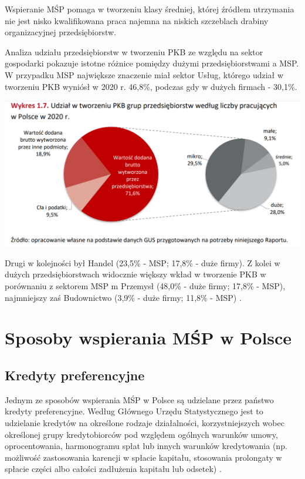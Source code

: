 \documentclass[11pt]{article}
\begin{document}
Wspieranie MŚP pomaga w tworzeniu klasy średniej, której źródłem utrzymania nie jest nisko kwalifikowana praca najemna 
na niskich szczeblach drabiny organizacyjnej przedsiębiorstw.
\medskip

Analiza udziału przedsiębiorstw w tworzeniu PKB ze względu na sektor gospodarki pokazuje istotne różnice
pomiędzy dużymi przedsiębiorstwami a MSP. W przypadku MSP największe znaczenie miał sektor Usług, którego udział w tworzeniu PKB wyniósł
w 2020 r. 46,8\%, podczas gdy w dużych firmach - 30,1\%.

\begin{center}
\includegraphics[scale=0.6]{img/udzialMSP.png}
\end{center}

Drugi w kolejności był Handel (23,5\% - MSP; 17,8\% - duże
firmy). Z kolei w dużych przedsiębiorstwach widocznie większy wkład w tworzenie PKB
w porównaniu z sektorem MSP m Przemysł (48,0\% - duże firmy; 17,8\% - MSP),
najmniejszy zaś Budownictwo (3,9\% - duże firmy; 11,8\% - MSP) \cite{RaportPARPoMSP}. 

\section*{Sposoby wspierania MŚP w Polsce}

\subsection*{Kredyty preferencyjne}

Jednym ze sposobów wspierania MŚP w Polsce są udzielane przez państwo kredyty preferencyjne.
Według Głównego Urzędu Statystycznego jest to udzielanie kredytów na określone rodzaje działalności, 
korzystniejszych wobec określonej grupy kredytobiorców pod względem ogólnych warunków umowy, oprocentowania, 
harmonogramu spłat lub innych warunków kredytowania (np. możliwość zastosowania karencji w spłacie kapitału, 
stosowania prolongaty w spłacie części albo całości zadłużenia kapitału lub odsetek) \cite{DefKredytPref}.
\end{document}
